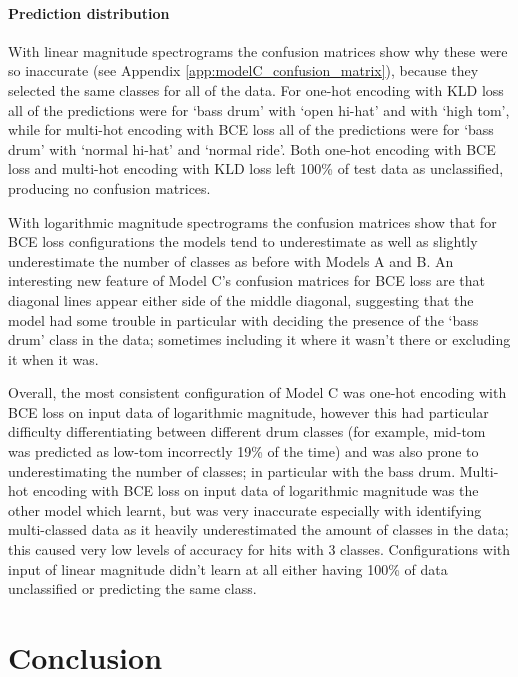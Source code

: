 \documentclass[12pt]{article}
\begin{document}
	\paragraph*{Prediction distribution}
	
	With linear magnitude spectrograms the confusion matrices show why these were so inaccurate (see Appendix \ref{app:modelC_confusion_matrix}), because they selected the same classes for all of the data. For one-hot encoding with KLD loss all of the predictions were for `bass drum' with `open hi-hat' and with `high tom', while for multi-hot encoding with BCE loss all of the predictions were for `bass drum' with `normal hi-hat' and `normal ride'. Both one-hot encoding with BCE loss and multi-hot encoding with KLD loss left 100\% of test data as unclassified, producing no confusion matrices.\medskip
	
	With logarithmic magnitude spectrograms the confusion matrices show that for BCE loss configurations the models tend to underestimate as well as slightly underestimate the number of classes as before with Models A and B. An interesting new feature of Model C's confusion matrices for BCE loss are that diagonal lines appear either side of the middle diagonal, suggesting that the model had some trouble in particular with deciding the presence of the `bass drum' class in the data; sometimes including it where it wasn't there or excluding it when it was.
	
	Overall, the most consistent configuration of Model C was one-hot encoding with BCE loss on input data of logarithmic magnitude, however this had particular difficulty differentiating between different drum classes (for example, mid-tom was predicted as low-tom incorrectly 19\% of the time) and was also prone to underestimating the number of classes; in particular with the bass drum. Multi-hot encoding with BCE loss on input data of logarithmic magnitude was the other model which learnt, but was very inaccurate especially with identifying multi-classed data as it heavily underestimated the amount of classes in the data; this caused very low levels of accuracy for hits with 3 classes. Configurations with input of linear magnitude didn't learn at all either having 100\% of data unclassified or predicting the same class. 
	
	\newpage
	\section{Conclusion}
	
\end{document}
